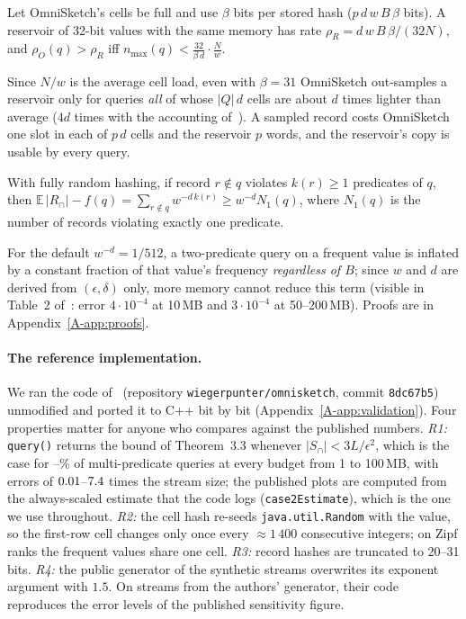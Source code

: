 \documentclass[sigconf]{acmart}
\newcommand{\omni}{OmniSketch\xspace}
\newcommand{\E}{\mathbb{E}}
\newcommand{\apx}[1]{Appendix~\ref{A-#1}}
\begin{document}
\begin{proposition}\label{prop:rate}
Let \omni's cells be full and use $\beta$ bits per stored hash ($p\,d\,w\,B\,\beta$ bits). A reservoir of
32-bit values with the same memory has rate $\rho_R = d\,w\,B\,\beta/(32N)$, and $\rho_O(q) > \rho_R$ iff
$n_{\max}(q) < \frac{32}{\beta\,d}\cdot\frac{N}{w}$.
\end{proposition}
Since $N/w$ is the average cell load, even with $\beta=31$ \omni out-samples a reservoir only for queries
\emph{all} of whose $|Q|\,d$ cells are about $d$ times lighter than average ($4d$ times with the accounting
of~\cite{omni}). A sampled record costs \omni one slot in each of $p\,d$ cells and the reservoir $p$ words,
and the reservoir's copy is usable by every query.

\begin{proposition}\label{prop:bias}
With fully random hashing, if record $r\notin q$ violates $k(r)\ge1$ predicates of $q$, then
$\E\,|R_\cap| - f(q) = \sum_{r\notin q} w^{-d\,k(r)} \ge w^{-d}N_1(q)$, where $N_1(q)$ is the number of
records violating exactly one predicate.
\end{proposition}
For the default $w^{-d}=1/512$, a two-predicate query on a frequent value is inflated by a constant
fraction of that value's frequency \emph{regardless of $B$}; since $w$ and $d$ are derived from
$(\epsilon,\delta)$ only, more memory cannot reduce this term (visible in Table~2 of~\cite{omni}: error
$4\cdot10^{-4}$ at 10\,MB and $3\cdot10^{-4}$ at 50--200\,MB). Proofs are in \apx{app:proofs}.

\paragraph{The reference implementation.}\label{sec:refimpl} We ran the code of~\cite{omni} (repository
\texttt{wiegerpunter/omnisketch}, commit \texttt{8dc67b5}) unmodified and ported it to C++ bit by bit
(\apx{app:validation}). Four properties matter for anyone who compares against the published numbers.
\emph{R1:} \texttt{query()} returns the bound of Theorem~3.3 whenever $|S_\cap|<3L/\epsilon^2$, which is
the case for \NumValBoundFracLo--\NumValBoundFracHi\% of multi-predicate queries at every budget from 1 to
100\,MB, with errors of $0.01$--$7.4$ times the stream size; the published plots
are computed from the always-scaled estimate that the code logs (\texttt{case2Estimate}), which is the one
we use throughout. \emph{R2:} the cell hash re-seeds \texttt{java.util.Random} with the value, so the
first-row cell changes only once every $\approx1\,400$ consecutive integers; on Zipf ranks the frequent
values share one cell. \emph{R3:} record hashes are truncated to 20--31 bits. \emph{R4:} the public
generator of the synthetic streams overwrites its exponent argument with $1.5$. On streams from the
authors' generator, their code reproduces the error levels of the published sensitivity figure.
\end{document}
